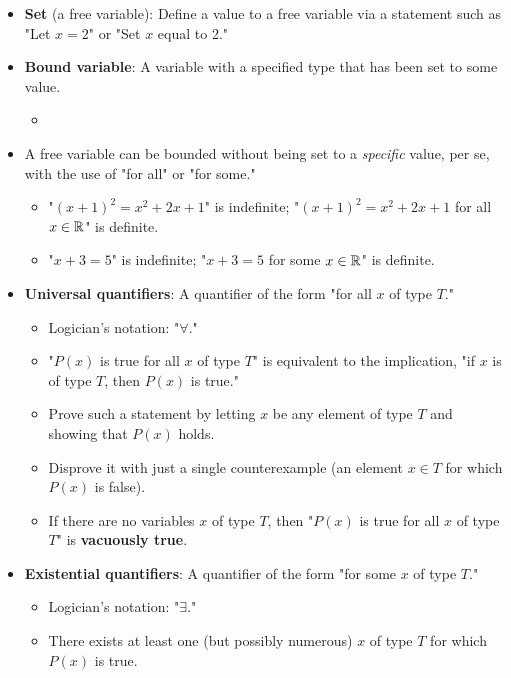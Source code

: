 \documentclass[../main.tex]{subfiles}
\begin{document}
\begin{itemize}
\begin{itemize}
    \end{itemize}
    \item \textbf{Set} (a free variable): Define a value to a free variable via a statement such as "Let $x=2$" or "Set $x$ equal to 2."
    \item \textbf{Bound variable}: A variable with a specified type that has been set to some value.
    \begin{itemize}
        \item {}
    \end{itemize}
    \item A free variable can be bounded without being set to a \emph{specific} value, per se, with the use of "for all" or "for some."
    \begin{itemize}
        \item "$(x+1)^2=x^2+2x+1$" is indefinite; "$(x+1)^2=x^2+2x+1$ for all $x\in\mathbb{R}$" is definite.
        \item "$x+3=5$" is indefinite; "$x+3=5$ for some $x\in\mathbb{R}$" is definite.
    \end{itemize}
    \item \textbf{Universal quantifiers}: A quantifier of the form "for all $x$ of type $T$."
    \begin{itemize}
        \item Logician's notation: "$\forall$."
        \item "$P(x)$ is true for all $x$ of type $T$" is equivalent to the implication, "if $x$ is of type $T$, then $P(x)$ is true."
        \item Prove such a statement by letting $x$ be any element of type $T$ and showing that $P(x)$ holds.
        \item Disprove it with just a single counterexample (an element $x\in T$ for which $P(x)$ is false).
        \item If there are no variables $x$ of type $T$, then "$P(x)$ is true for all $x$ of type $T$" is \textbf{vacuously true}.
    \end{itemize}
    \item \textbf{Existential quantifiers}: A quantifier of the form "for some $x$ of type $T$."
    \begin{itemize}
        \item Logician's notation: "$\exists$."
        \item There exists at least one (but possibly numerous) $x$ of type $T$ for which $P(x)$ is true.

\end{itemize}
\end{itemize}
\end{document}

